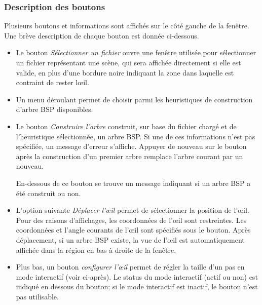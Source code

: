 \subsubsection*{Description des boutons}
Plusieurs boutons et informations sont affichés sur le côté gauche de
la fenêtre. Une brève description de chaque bouton est donnée ci-dessous.
\begin{itemize}
\item Le bouton \emph{Sélectionner un fichier} ouvre une fenêtre utilisée
  pour sélectionner un fichier représentant une scène, qui sera affichée
  directement si elle est valide, en plus d'une bordure noire indiquant
  la zone dans laquelle est contraint de rester l\oe{}il.
\item Un menu déroulant permet
  de choisir parmi les heuristiques
  de construction d'arbre BSP disponibles.
\item Le bouton \emph{Construire l'arbre} construit, sur base du fichier
  chargé et de l'heuristique sélectionnée, un arbre BSP.
  Si une de ces informations n'est pas spécifiée, un message d'erreur s'affiche.
  Appuyer de nouveau sur le bouton après la construction d'un premier arbre
  remplace l'arbre courant par un nouveau.

  En-dessous de ce bouton se trouve un message indiquant si  un arbre BSP a été
  construit ou non.
\item L'option suivante \emph{Déplacer l'\oe{}il} permet de sélectionner
  la position de l'\oe{}il. Pour des raisons d'affichages, les coordonnées de
  l'\oe{}il sont restreintes. Les coordonnées et l'angle courants de
  l'\oe{}il sont spécifiés sous le bouton. Après déplacement, si un arbre
  BSP existe, la vue de l'\oe{}il est automatiquement affichée dans la région
  en bas à droite de la fenêtre.
\item Plus bas, un bouton \emph{configurer l'\oe{}il} permet de régler la
  taille d'un pas en mode interactif (voir ci-après). Le status du mode
  interactif (actif ou non) est indiqué en dessous du bouton; si
  le mode interactif est inactif, le bouton n'est pas utilisable.
\end{itemize}
